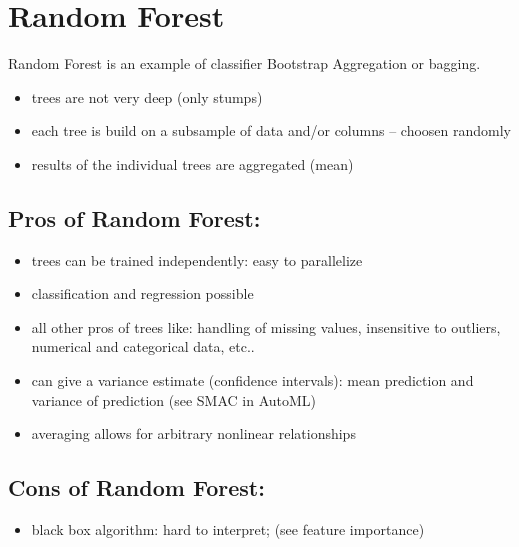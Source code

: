 \documentclass[letterpaper,10pt,english]{jupyterBook}
\begin{document}
\section{Random Forest}
\label{\detokenize{Tree_Methods:random-forest}}
\sphinxAtStartPar
Random Forest is an example of classifier Bootstrap Aggregation or bagging.
\begin{itemize}
\item {} 
\sphinxAtStartPar
trees are not very deep (only stumps)

\item {} 
\sphinxAtStartPar
each tree is build on a subsample of data and/or columns – choosen randomly

\item {} 
\sphinxAtStartPar
results of the individual trees are aggregated (mean)

\end{itemize}


\subsection{Pros of Random Forest:}
\label{\detokenize{Tree_Methods:pros-of-random-forest}}\begin{itemize}
\item {} 
\sphinxAtStartPar
trees can be trained independently: easy to parallelize

\item {} 
\sphinxAtStartPar
classification and regression possible

\item {} 
\sphinxAtStartPar
all other pros of trees like: handling of missing values, insensitive to outliers, numerical and categorical data, etc..

\item {} 
\sphinxAtStartPar
can give a variance estimate (confidence intervals): mean prediction and variance of prediction (see SMAC in AutoML)

\item {} 
\sphinxAtStartPar
averaging allows for arbitrary non\sphinxhyphen{}linear relationships

\end{itemize}


\subsection{Cons of Random Forest:}
\label{\detokenize{Tree_Methods:cons-of-random-forest}}\begin{itemize}
\item {} 
\sphinxAtStartPar
black box algorithm: hard to interpret; (see feature importance)

\end{itemize}
\end{document}
